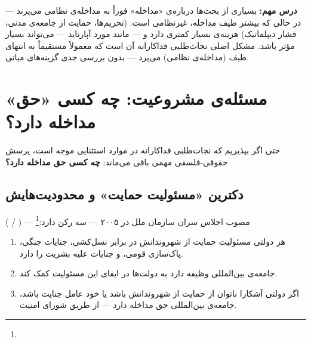 \textbf{درس مهم:} بسیاری از بحث‌ها درباره‌ی «مداخله» فوراً به مداخله‌ی نظامی می‌پرند — در حالی که بیشتر طیف مداخله، غیرنظامی است.  (تحریم‌ها، حمایت از جامعه‌ی مدنی، فشار دیپلماتیک) هزینه‌ی بسیار کمتری دارد و — مانند مورد آپارتاید — می‌تواند بسیار مؤثر باشد. مشکل اصلی نجات‌طلبی فداکارانه آن است که معمولاً مستقیماً به انتهای طیف (مداخله‌ی نظامی) می‌پرد — بدون بررسی جدی گزینه‌های میانی.


\section{مسئله‌ی مشروعیت: چه کسی «حق» مداخله دارد؟}
\label{sec:ch15-legitimacy}

حتی اگر بپذیریم که نجات‌طلبی فداکارانه در موارد استثنایی موجه است، پرسش حقوقی-فلسفی مهمی باقی می‌ماند: \textbf{چه کسی حق مداخله دارد؟}

\subsection{دکترین «مسئولیت حمایت» و محدودیت‌هایش}
\label{subsec:ch15-r2p}

 ( / ) — مصوب اجلاس سران سازمان ملل در ۲۰۰۵ — سه رکن دارد:\footnote{}

\begin{enumerate}
\item هر دولتی مسئولیت حمایت از شهروندانش در برابر نسل‌کشی، جنایات جنگی، پاک‌سازی قومی، و جنایات علیه بشریت را دارد.
\item جامعه‌ی بین‌المللی وظیفه دارد به دولت‌ها در ایفای این مسئولیت کمک کند.
\item اگر دولتی آشکارا ناتوان از حمایت از شهروندانش باشد یا خود عامل جنایت باشد، جامعه‌ی بین‌المللی حق مداخله دارد — از طریق شورای امنیت.

\end{enumerate}

